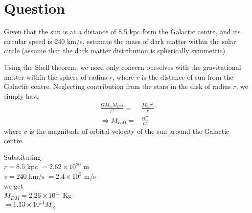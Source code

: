\documentclass[paper=a4, fontsize=11pt]{scrartcl} %
\numberwithin{equation}{section} %
\numberwithin{figure}{section} %
\numberwithin{table}{section} %
\begin{document}
\section{Question}
	Given that the sun is at a distance of 8.5 kpc form the Galactic centre, and its circular speed is 240 km/s, estimate the mass of dark matter within the solar circle (assume that the dark matter distribution is spherically symmetric)\\
	\par
	Using the Shell theorem, we need only concern ourselves with the gravitational matter within the sphere of radius $r$, where $r$ is the distance of sun from the Galactic centre. Neglecting contribution from the stars in the disk of radius $r$, we simply have
	\begin{equation}
	\begin{split}
		\frac{GM_\odot M_{DM}}{r^2} = &\frac{M_\odot v^2}{r} \\
		\Rightarrow M_{DM}= &\frac{rv^2}{G}
	\end{split}
	\end{equation}
	where $v$ is the magnitude of orbital velocity of the sun around the Galactic centre.
	\par
	Substituting\\
	$r=8.5$ kpc $=2.62\times 10^{20}$ m\\
	$v=240$ km/s $=2.4 \times 10^5$ m/s\\
	we get\\
	$M_{DM}= 2.26 \times 10^{41}$ Kg\\
	$=1.13\times10^{11} M_\odot$
\end{document}
